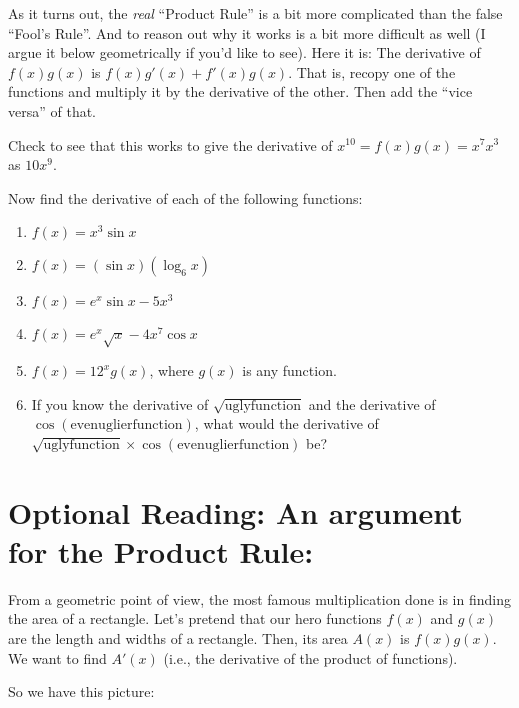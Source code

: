 \documentclass{ximera}
\begin{document}
     As it turns out, the {\em real} ``Product Rule'' is a bit more complicated than the false ``Fool's Rule''.  And to reason out why it works is a bit more difficult as well (I argue it below geometrically if you'd like to see).  Here it is:  The derivative of $f(x) g(x)$ is  $f(x)g'(x) + f'(x) g(x)$.  That is, recopy one of the functions and multiply it by the derivative of the other.  Then add the ``vice versa'' of that.
     
    Check to see that this works to give the derivative of $x^{10} = f(x)g(x) = x^7x^3$ as  $10x^9$.

\begin{question}
Now find the derivative of each of the following functions:
\begin{enumerate}
    \item $f(x) = x^3\sin x$
    \item $f(x) = (\sin x)(\log_6 x)$
    \item $f(x) = e^x \sin x - 5x^3$
    \item $f(x) = e^x\sqrt{x} - 4x^7\cos x$
    \item $f(x) = 12^xg(x)$, where $g(x)$ is any function.
    \item If you know the derivative of $\sqrt{\text{uglyfunction}}$ and the derivative of  $\cos(\text{evenuglierfunction})$, what would the derivative of  $\sqrt{\text{uglyfunction}}\times \cos(\text{evenuglierfunction})$  be?
\end{enumerate}
\end{question}

\section*{Optional Reading: An argument for the Product Rule:}

   From a geometric point of view, the most famous multiplication done is in finding the area of a rectangle.  Let’s pretend that our hero functions $f(x)$ and $g(x)$ are the length and widths of a rectangle.  Then, its area $A(x)$ is $f(x)g(x)$.  We want to find $A'(x)$ (i.e., the derivative of the product of functions).  
   
    So we have this picture:
    \begin{center}
    \end{center}
 
\end{document}
